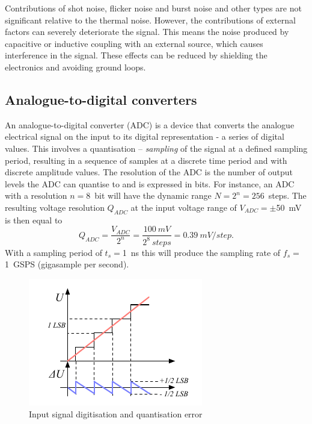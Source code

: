\documentclass[twoside,12pt]{packages/mytustyle}  %
\begin{document}
Contributions of shot noise, flicker noise and burst noise and other types are not significant relative to the thermal noise. However, the contributions of external factors can severely deteriorate the signal. This means the noise produced by capacitive or inductive coupling with an external source, which causes interference in the signal. These effects can be reduced by shielding the electronics and avoiding ground loops. 

\subsection{Analogue-to-digital converters}
An analogue-to-digital converter (ADC) is a device that converts the analogue electrical signal on the input to its digital representation - a series of digital values. This involves a quantisation -- \emph{sampling} of the signal at a defined sampling period, resulting in a sequence of samples at a discrete time period and with discrete amplitude values. The resolution of the ADC is the number of output levels the ADC can quantise to and is expressed in bits. For instance, an ADC with a resolution $n=8$~bit will have the dynamic range $N=2^n=256$~steps. The resulting voltage resolution $Q_{ADC}$ at the input voltage range of $V_{ADC}=\pm$50~mV is then equal to 
\begin{equation}
\label{eq:mvpercnt}
Q_{ADC}=\frac{V_{ADC}}{2^{n}}  = \frac{100~mV}{2^8~steps} = 0.39~mV/step.
\end{equation} 
With a sampling period of $t_s=$1~ns this will produce the sampling rate of $f_s=$1~GSPS (gigasample per second).
\begin{figure}[!t]
\begin{center}
\includegraphics[width=0.55\linewidth]{plots/qerr}
\caption{Input signal digitisation and quantisation error}
\label{fig:qerr}
\end{center}
\end{figure}
\end{document}
